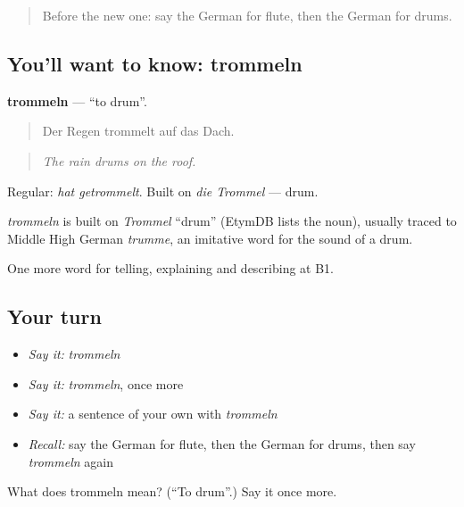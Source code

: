 \label{lesson:GE-C513-trommeln}



\begin{quote}
Before the new one: say the German for flute, then the German for drums.
\end{quote}

\subsection*{You'll want to know: trommeln}
\textbf{trommeln} — \textquotedblleft{}to drum\textquotedblright{}.

\begin{quote}
Der Regen trommelt auf das Dach.
\end{quote}

\begin{quote}
\emph{The rain drums on the roof.}
\end{quote}

Regular: \emph{hat getrommelt}. Built on \emph{die Trommel} — drum.

\begin{cousinweb}
\emph{trommeln} is built on \emph{Trommel} \textquotedblleft{}drum\textquotedblright{} (EtymDB lists the noun), usually traced to Middle High German \emph{trumme}, an imitative word for the sound of a drum.
\end{cousinweb}

\begin{grammarlens}[title={What you've built}]
One more word for telling, explaining and describing at B1.
\end{grammarlens}

\subsection*{Your turn}
\begin{itemize}
\raggedright
  \item \emph{Say it:} \emph{trommeln}
  \item \emph{Say it:} \emph{trommeln}, once more
  \item \emph{Say it:} a sentence of your own with \emph{trommeln}
  \item \emph{Recall:} say the German for flute, then the German for drums, then say \emph{trommeln} again
\end{itemize}

\begin{tcolorbox}[breakable,colback=teal!4,colframe=teal!35!black,title={Before you move on}]
What does trommeln mean? (\textquotedblleft{}To drum\textquotedblright{}.) Say it once more.
\end{tcolorbox}

